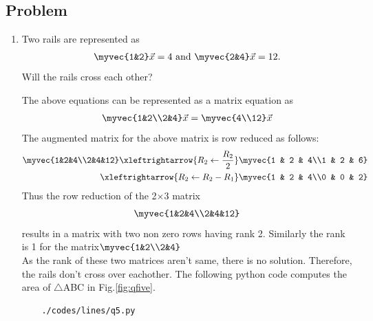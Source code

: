 \subsection{Problem}

\renewcommand{\theequation}{\theenumi}
\begin{enumerate}[label=\thesection.\arabic*.,ref=\thesection.\theenumi]
	\item Two rails are represented as 
	\begin{multline}
	\myvec{1&2}\vec{x}=4\text{ and }\myvec{2&4}\vec{x}=12.
	\end{multline}
	\quad Will the rails cross each other?
	
	\solution The above equations can be represented as a matrix equation as
	\begin{align}\myvec{1&2\\2&4}\vec{x}=\myvec{4\\12}\vec{x}\end{align}
	The augmented matrix for the above matrix is row reduced as follows:
	\begin{align}\myvec{1&2&4\\2&4&12}\xleftrightarrow {R_2\leftarrow \frac{R_2}{2}}\myvec{1 & 2 & 4\\1 & 2 & 6} \\
\xleftrightarrow {R_2\leftarrow R_2 - R_1}\myvec{1 & 2 & 4\\0 & 0 & 2}
\end{align}
	Thus the row reduction of the 2$\times$3 matrix 
	\begin{align}
		\myvec{1&2&4\\2&4&12}
	\end{align}
	results in a matrix with two non zero rows having rank 2. Similarly the rank is 1 for the matrix$\myvec{1&2\\2&4}$\\
	As the rank of these two matrices aren't same, there is no solution. Therefore, the rails don't cross over eachother.
	The following python code computes the area of $\triangle$ABC in Fig.\ref{fig:qfive}.
	\begin{lstlisting}
	./codes/lines/q5.py
	\end{lstlisting}
	\begin{figure}[!ht]
	\centering

\end{figure}
\end{enumerate}
